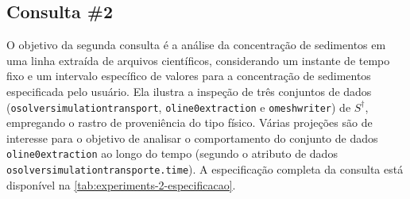 \subsection{Consulta \#2}

%

%

O objetivo da segunda consulta é a análise da concentração de sedimentos em uma linha extraída de arquivos científicos, considerando um instante de tempo fixo e um intervalo específico de valores para a concentração de sedimentos especificada pelo usuário. Ela ilustra a inspeção de três conjuntos de dados (\texttt{osolversimulationtransport}, \texttt{oline0extraction} e \texttt{omeshwriter}) de \(S^{\dagger}\), empregando o rastro de proveniência do tipo físico. Várias projeções são de interesse para o objetivo de analisar o comportamento do conjunto de dados \texttt{oline0extraction} ao longo do tempo (segundo o atributo de dados \texttt{osolversimulationtransporte.time}). A especificação completa da consulta está disponível na \autoref{tab:experiments-2-especificacao}.

